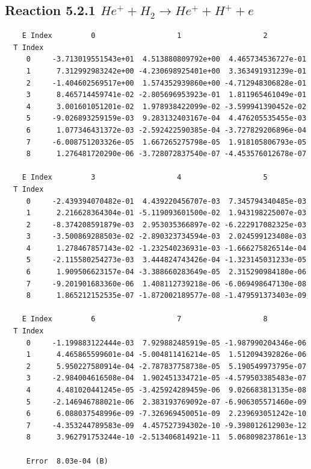 \documentclass[12pt,dvipdfmx]{article}
\begin{document}
\newpage
\subsection{
Reaction 5.2.1 $   He^+ + H_2 \rightarrow He^+ + H^+ + e$}


\begin{small}\begin{verbatim}
    E Index         0                   1                   2
  T Index
     0     -3.713019551543e+01  4.513880809792e+00  4.465734536727e-01
     1      7.312992983242e+00 -4.230698925401e+00  3.363491931239e-01
     2     -1.404602569517e+00  1.574352939860e+00 -4.712948306828e-01
     3      8.465714459741e-02 -2.805696953923e-01  1.811965461049e-01
     4      3.001601051201e-02  1.978938422099e-02 -3.599941390452e-02
     5     -9.026893259159e-03  9.283132403167e-04  4.476205535455e-03
     6      1.077346431372e-03 -2.592422590385e-04 -3.727829206896e-04
     7     -6.008751203326e-05  1.667265275798e-05  1.918105806793e-05
     8      1.276481720290e-06 -3.728072837540e-07 -4.453576012678e-07

    E Index         3                   4                   5
  T Index
     0     -2.439394070482e-01  4.439220456707e-03  7.345794340485e-03
     1      2.216628364304e-01 -5.119093601500e-02  1.943198225007e-03
     2     -8.374208591879e-03  2.953035366897e-02 -6.222917082325e-03
     3     -3.500869288503e-02 -2.890323734594e-03  2.024599123408e-03
     4      1.278467857143e-02 -1.232540236931e-03 -1.666275826514e-04
     5     -2.115580254273e-03  3.444824743426e-04 -1.323145031233e-05
     6      1.909506623157e-04 -3.388660283649e-05  2.315290984180e-06
     7     -9.201901683360e-06  1.408112739218e-06 -6.069498647130e-08
     8      1.865212152535e-07 -1.872002189577e-08 -1.479591373403e-09

    E Index         6                   7                   8
  T Index
     0     -1.199883122444e-03  7.929882485919e-05 -1.987990204346e-06
     1      4.465865599601e-04 -5.004811416214e-05  1.512094392826e-06
     2      5.950227580914e-04 -2.787837758738e-05  5.190549973795e-07
     3     -2.984004616508e-04  1.902451334721e-05 -4.579503385483e-07
     4      4.481020441245e-05 -3.425924289459e-06  9.026683813135e-08
     5     -2.146946788021e-06  2.383193769092e-07 -6.906305571460e-09
     6      6.088037548996e-09 -7.326969450051e-09  2.239693051242e-10
     7     -4.353244789583e-09  4.457527394302e-10 -9.398012612903e-12
     8      3.962791753244e-10 -2.513406814921e-11  5.068098237861e-13

     Error  8.03e-04 (B)
\end{verbatim}\end{small}
\end{document}
